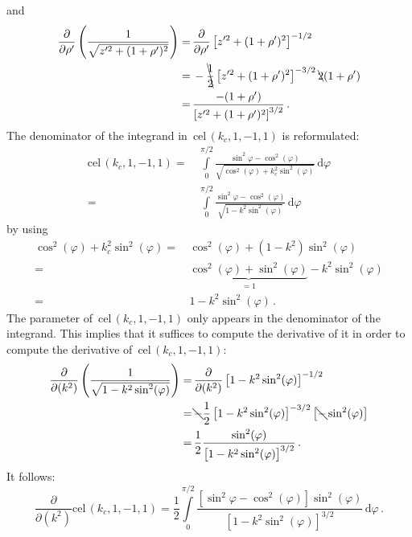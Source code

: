 and
\begin{align}
      \frac{\partial}{\partial \rho'} \left( \frac{1}{\sqrt{z'^2 + (1 + \rho')^2}} \right)
 =&\, \frac{\partial}{\partial \rho'} \left[ z'^2 + (1 + \rho')^2 \right]^{-1/2} \nonumber \\
 =&\, - \bcancel{\frac{1}{2}} \left[ z'^2 + (1 + \rho')^2 \right]^{-3/2} \bcancel{2} (1 + \rho') \nonumber \\
 =&\, \frac{- (1 + \rho')}{\left[ z'^2 + (1 + \rho')^2 \right]^{3/2} } \, .
\end{align}
The denominator of the integrand in~$\textrm{cel}\,(k_c, 1, -1, 1)$ is reformulated:
\begin{align}
  \textrm{cel}\,(k_c, 1, -1, 1)
 =&\, \int\limits_0^{\pi/2} \frac{\sin^2{\varphi} - \cos^2(\varphi)}{\sqrt{\cos^2(\varphi) + k_c^2 \sin^2(\varphi)}} \,\mathrm{d}\varphi \nonumber \\
 =&\, \int\limits_0^{\pi/2} \frac{\sin^2{\varphi} - \cos^2(\varphi)}{\sqrt{1 - k^2 \sin^2(\varphi)}} \,\mathrm{d}\varphi
\end{align}
by using
\begin{align}
      \cos^2(\varphi) + k_c^2 \sin^2(\varphi)
 =&\, \cos^2(\varphi) + (1 - k^2) \sin^2(\varphi) \nonumber \\
 =&\, \underbrace{\cos^2(\varphi) + \sin^2(\varphi)}_{=1} - k^2 \sin^2(\varphi) \nonumber \\
 =&\, 1 - k^2 \sin^2(\varphi) \, .
\end{align}
The parameter of~$\textrm{cel}\,(k_c, 1, -1, 1)$ only appears in the denominator of the integrand.
This implies that it suffices to compute the derivative of it
in order to compute the derivative of~$\textrm{cel}\,(k_c, 1, -1, 1)$:
\begin{align}
      \frac{\partial}{\partial(k^2)} \left( \frac{1}{\sqrt{1 - k^2 \sin^2(\varphi)}} \right)
 =&\, \frac{\partial}{\partial(k^2)} \left[1 - k^2 \sin^2(\varphi)\right]^{-1/2} \nonumber \\
 =&\, \bcancel{-} \frac{1}{2} \left[1 - k^2 \sin^2(\varphi)\right]^{-3/2} \left[ \bcancel{-} \sin^2(\varphi) \right] \nonumber \\
 =&\, \frac{1}{2} \frac{\sin^2(\varphi)}{\left[1 - k^2 \sin^2(\varphi)\right]^{3/2}} \, .
\end{align}
It follows:
\begin{equation}
  \frac{\partial}{\partial(k^2)} \textrm{cel}\,(k_c, 1, -1, 1)
 = \frac{1}{2} \int\limits_0^{\pi/2} \frac{\left[\sin^2{\varphi} - \cos^2(\varphi)\right]\sin^2(\varphi)}{\left[1 - k^2 \sin^2(\varphi)\right]^{3/2}} \,\mathrm{d}\varphi \, .
\end{equation}
